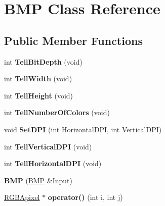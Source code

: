 \hypertarget{class_b_m_p}{\section{B\-M\-P Class Reference}
\label{class_b_m_p}
}
\subsection*{Public Member Functions}
\begin{DoxyCompactItemize}
\item 
\hypertarget{class_b_m_p_a4ce7ba10524707a536bfd3f69e4a7934}{int {\bfseries Tell\-Bit\-Depth} (void)}\label{class_b_m_p_a4ce7ba10524707a536bfd3f69e4a7934}

\item 
\hypertarget{class_b_m_p_addbaef07743df3bc6b15195709015d1a}{int {\bfseries Tell\-Width} (void)}\label{class_b_m_p_addbaef07743df3bc6b15195709015d1a}

\item 
\hypertarget{class_b_m_p_a76cff2e39ca9e1c3d7f2d6bbec0a3091}{int {\bfseries Tell\-Height} (void)}\label{class_b_m_p_a76cff2e39ca9e1c3d7f2d6bbec0a3091}

\item 
\hypertarget{class_b_m_p_a2db1f1954c322028359d2c8db084f8d6}{int {\bfseries Tell\-Number\-Of\-Colors} (void)}\label{class_b_m_p_a2db1f1954c322028359d2c8db084f8d6}

\item 
\hypertarget{class_b_m_p_a7ff803dfff74e560f648ac25dce0846d}{void {\bfseries Set\-D\-P\-I} (int Horizontal\-D\-P\-I, int Vertical\-D\-P\-I)}\label{class_b_m_p_a7ff803dfff74e560f648ac25dce0846d}

\item 
\hypertarget{class_b_m_p_ad0d9bf394d15684619ff7516457059b3}{int {\bfseries Tell\-Vertical\-D\-P\-I} (void)}\label{class_b_m_p_ad0d9bf394d15684619ff7516457059b3}

\item 
\hypertarget{class_b_m_p_a2000c6bed1e4a1776fa625e6a8c7c8a3}{int {\bfseries Tell\-Horizontal\-D\-P\-I} (void)}\label{class_b_m_p_a2000c6bed1e4a1776fa625e6a8c7c8a3}

\item 
\hypertarget{class_b_m_p_a3c73465aac82d707e77871c66dc4d2f9}{{\bfseries B\-M\-P} (\hyperlink{class_b_m_p}{B\-M\-P} \&Input)}\label{class_b_m_p_a3c73465aac82d707e77871c66dc4d2f9}

\item 
\hypertarget{class_b_m_p_adcae214f9928fb816962f39f08d33744}{\hyperlink{struct_r_g_b_apixel}{R\-G\-B\-Apixel} $\ast$ {\bfseries operator()} (int i, int j)}\label{class_b_m_p_adcae214f9928fb816962f39f08d33744}


\end{DoxyCompactItemize}
